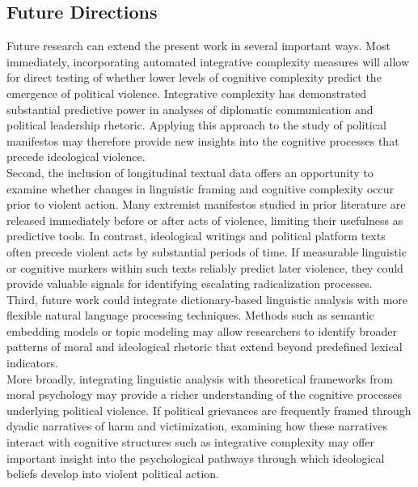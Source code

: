 \documentclass[
  english,
  man,floatsintext]{apa6}
\begin{document}
\subsection{Future Directions}\label{future-directions}

Future research can extend the present work in several important ways. Most immediately, incorporating automated integrative complexity measures will allow for direct testing of whether lower levels of cognitive complexity predict the emergence of political violence. Integrative complexity has demonstrated substantial predictive power in analyses of diplomatic communication and political leadership rhetoric. Applying this approach to the study of political manifestos may therefore provide new insights into the cognitive processes that precede ideological violence.\\
Second, the inclusion of longitudinal textual data offers an opportunity to examine whether changes in linguistic framing and cognitive complexity occur prior to violent action. Many extremist manifestos studied in prior literature are released immediately before or after acts of violence, limiting their usefulness as predictive tools. In contrast, ideological writings and political platform texts often precede violent acts by substantial periods of time. If measurable linguistic or cognitive markers within such texts reliably predict later violence, they could provide valuable signals for identifying escalating radicalization processes.\\
Third, future work could integrate dictionary-based linguistic analysis with more flexible natural language processing techniques. Methods such as semantic embedding models or topic modeling may allow researchers to identify broader patterns of moral and ideological rhetoric that extend beyond predefined lexical indicators.\\
More broadly, integrating linguistic analysis with theoretical frameworks from moral psychology may provide a richer understanding of the cognitive processes underlying political violence. If political grievances are frequently framed through dyadic narratives of harm and victimization, examining how these narratives interact with cognitive structures such as integrative complexity may offer important insight into the psychological pathways through which ideological beliefs develop into violent political action.\\
\end{document}

